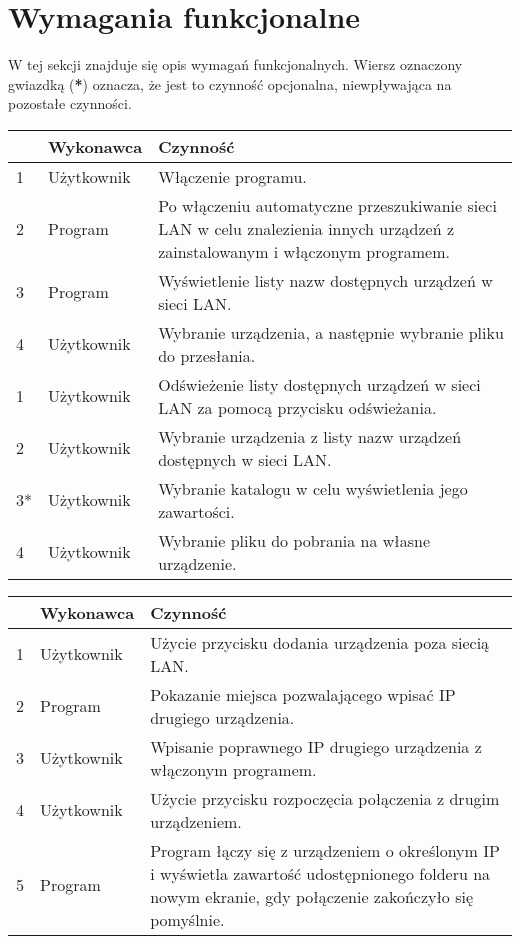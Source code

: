 \documentclass[12pt,a4paper]{article}
\begin{document}
\section{Wymagania funkcjonalne}
W tej sekcji znajduje się opis wymagań funkcjonalnych. Wiersz oznaczony gwiazdką (\textbf{*}) oznacza, że jest to czynność opcjonalna, niewpływająca na pozostałe czynności.

\begin{center}
	\begin{tabular}{|l|p{5em}|p{30em}|}
	\hline 
	 & Wykonawca & Czynność \\ 
	\hline
	1 & Użytkownik & Włączenie programu. \\
	\hline
	2 & Program & Po włączeniu automatyczne przeszukiwanie sieci LAN w celu znalezienia innych urządzeń z zainstalowanym i włączonym programem. \\
	\hline
	3 & Program & Wyświetlenie listy nazw dostępnych urządzeń w sieci LAN. \\
	\hline
	4 & Użytkownik & Wybranie urządzenia, a następnie wybranie pliku do przesłania. \\
	\hline
	\hline 
	1 & Użytkownik & Odświeżenie listy dostępnych urządzeń w sieci LAN za pomocą przycisku odświeżania. \\ 
	\hline 
	2 & Użytkownik & Wybranie urządzenia z listy nazw urządzeń dostępnych w sieci LAN. \\ 
	\hline 
	3* & Użytkownik & Wybranie katalogu w celu wyświetlenia jego zawartości. \\
	\hline
	4 & Użytkownik & Wybranie pliku do pobrania na własne urządzenie. \\
	\hline
	\end{tabular}
	
	\begin{tabular}{|l|p{5em}|p{30em}|}
	\hline 
	 & Wykonawca & Czynność \\
	\hline
	1 & Użytkownik & Użycie przycisku dodania urządzenia poza siecią LAN. \\
	\hline
	2 & Program & Pokazanie miejsca pozwalającego wpisać IP drugiego urządzenia.\\
	\hline
	3 & Użytkownik & Wpisanie poprawnego IP drugiego urządzenia z włączonym programem. \\
	\hline
	4 & Użytkownik & Użycie przycisku rozpoczęcia połączenia z drugim urządzeniem. \\ 
	\hline
	5 & Program & Program łączy się z urządzeniem o określonym IP i wyświetla zawartość udostępnionego folderu na nowym ekranie, gdy połączenie zakończyło się pomyślnie. \\
	\hline
	\end{tabular} 
	

\end{center}
\end{document}
